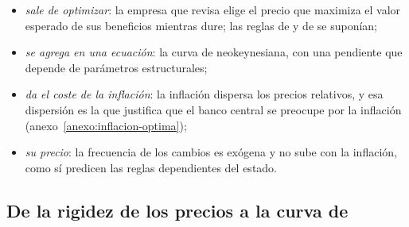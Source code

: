 \documentclass[11pt]{article}
\begin{document}
\begin{anotaciones}
\begin{itemize}
\begin{itemize}
  \item \emph{sale de optimizar}: la empresa que revisa elige el precio que maximiza el valor esperado de sus beneficios mientras dure; las reglas de  y de  se suponían;
  \item \emph{se agrega en una ecuación}: la curva de  neokeynesiana, con una pendiente que depende de parámetros estructurales;
  \item \emph{da el coste de la inflación}: la inflación dispersa los precios relativos, y esa dispersión es la que justifica que el banco central se preocupe por la inflación (anexo~\ref{anexo:inflacion-optima});
  \item \emph{su precio}: la frecuencia de los cambios es exógena y no sube con la inflación, como sí predicen las reglas dependientes del estado.
  \end{itemize}
\end{itemize}
\begin{figuracaja}
\caption{Cómo se fijan los precios en cada modelo ante una subida permanente del dinero}\label{fig:reglas-precios}
\end{figuracaja}
\end{anotaciones}

\subsection{De la rigidez de los precios a la curva de }\label{anexo:nkpc}
\end{document}

